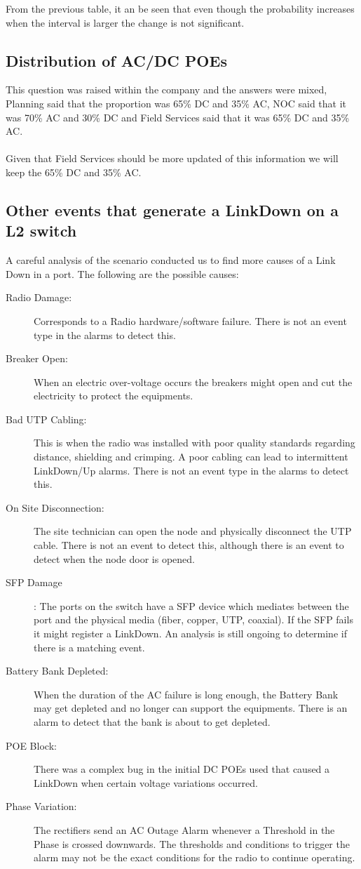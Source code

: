 \documentclass[10pt,a4paper]{article}
\begin{document}
From the previous table, it an be seen that even though the probability increases when the interval is larger the change is not significant.

\subsection{Distribution of AC/DC POEs}
This question was raised within the company and the answers were mixed, Planning said that the proportion was 65\% DC and 35\% AC, NOC said that it was 70\% AC and 30\% DC and Field Services said that it was 65\% DC and 35\% AC.
\\\\
Given that Field Services should be more updated of this information we will keep the 65\% DC and 35\% AC.

\subsection{Other events that generate a LinkDown on a L2 switch}
A careful analysis of the scenario conducted us to find more causes of a Link Down in a port. The following are the possible causes:

\begin{description}
\item[Radio Damage:] Corresponds to a Radio hardware/software failure. There is not an event type in the alarms to detect this.
\item[Breaker Open:] When an electric over-voltage occurs the breakers might open and cut the electricity to protect the equipments.
\item[Bad UTP Cabling:] This is when the radio was installed with poor quality standards regarding distance, shielding and crimping. A poor cabling can lead to intermittent LinkDown/Up alarms. There is not an event type in the alarms to detect this.
\item[On Site Disconnection:] The site technician can open the node and physically disconnect the UTP cable. There is not an event to detect this, although there is an event to detect when the node door is opened.
\item[SFP Damage]: The ports on the switch have a SFP device which mediates between the port and the physical media (fiber, copper, UTP, coaxial). If the SFP fails it might register a LinkDown. An analysis is still ongoing to determine if there is a matching event.
\item[Battery Bank Depleted:] When the duration of the AC failure is long enough, the Battery Bank may get depleted and no longer can support the equipments. There is an alarm to detect that the bank is about to get depleted.
\item[POE Block:] There was a complex bug in the initial DC POEs used that caused a LinkDown when certain voltage variations occurred.
\item[Phase Variation:] The rectifiers send an AC Outage Alarm whenever a Threshold in the Phase is crossed downwards. The thresholds and conditions to trigger the alarm may not be the exact conditions for the radio to continue operating.
\end{description}
\end{document}
